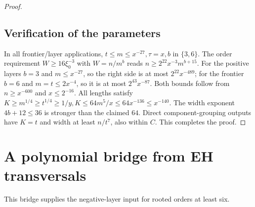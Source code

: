 \documentclass[11pt,a4paper]{article}
\theoremstyle{definition}
\theoremstyle{remark}
\numberwithin{equation}{section}
\begin{document}
\begin{proof}
\subsection{Verification of the parameters}\label{subsec:rp5-checks}
In all frontier/layer applications, \(t\le\allowbreak m\le\allowbreak x^{-27},\allowbreak  \tau=x,\allowbreak  b\) in \(\{3,\allowbreak 6\}\). The order requirement \(W\ge 16\xi_{0}^{-3}\) with \(W=n/m^{b}\) reads \(n\ge 2^{22} x^{-3} m^{b+15}\). For the positive layers \(b=3\) and \(m\le x^{-27}\), so the right side is at most \(2^{22} x^{-489}\); for the frontier \(b=6\) and \(m=t\le 2x^{-4}\), so it is at most \(2^{43} x^{-87}\). Both bounds follow from \(n\ge x^{-600}\) and \(x\le 2^{-16}\). All lengths satisfy \(K\ge\allowbreak m^{1/4}\ge\allowbreak t^{1/4}\ge\allowbreak 1/y,\allowbreak  K\le\allowbreak 64m^{5}/x\le\allowbreak 64x^{-136}\le\allowbreak x^{-140}\). The width exponent \(4b+12\le\allowbreak 36\) is stronger than the claimed \(64\). Direct component-grouping outputs have \(K=t\) and width at least \(n/t^{7}\), also within \(C\). This completes the proof.
\end{proof}

\section{A polynomial bridge from EH transversals}\label{app:bridge}

This bridge supplies the negative-layer input for rooted orders at least six.
\end{document}
